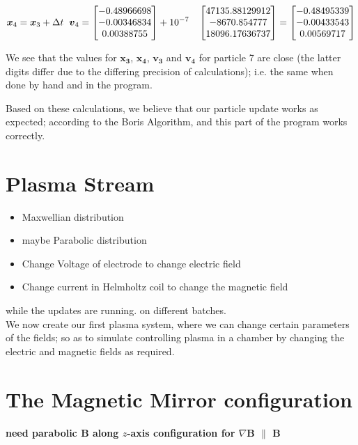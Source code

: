 \documentclass[12pt]{article}
\begin{document}
\begin{tcolorbox}
	$$\boldsymbol{x}_{4} = \boldsymbol{x}_{3} + \Delta t \hspace{0.2cm}\boldsymbol{v}_{4} = \begin{bmatrix}
	-0.48966698 \\ -0.00346834 \\  0.00388755
\end{bmatrix} + 10^{-7} \hspace{0.2cm}\ \begin{bmatrix}
	47135.88129912 \\ -8670.854777 \\ 18096.17636737
\end{bmatrix} = \begin{bmatrix}
	-0.48495339 \\ -0.00433543 \\  0.00569717
\end{bmatrix}$$
\end{tcolorbox}
We see that the values for $\boldsymbol{x_{3}}$, $\boldsymbol{x_{4}}$, $\boldsymbol{v_{3}}$ and $\boldsymbol{v_{4}}$ for particle 7 are close (the latter digits differ due to the differing precision of calculations); i.e. the same when done by hand and in the program.	

Based on these calculations, we believe that our particle update works as expected; according to the Boris Algorithm, and this part of the program works correctly. 
		
	\section{Plasma Stream}
	\color{red}
	\begin{itemize}
		\item Maxwellian distribution
		\item maybe Parabolic distribution
	\end{itemize}
	\begin{itemize}
		\item Change Voltage of electrode to change electric field
		\item Change current in Helmholtz coil to change the magnetic field 
	\end{itemize}
		while the updates are running.
		on different batches.
	\color{black}	\\ 
	We now create our first plasma system, where we can change certain parameters of the fields; so as to simulate controlling plasma in a chamber by changing the electric and magnetic fields as required.
	
	\section{The Magnetic Mirror configuration}
	\color{red}
	\textbf{need parabolic $\mathbf{B}$ along $z$-axis configuration for $\nabla$$\mathbf{B}$ $\parallel$ $\mathbf{B}$ }
	\color{black}
\end{document}
